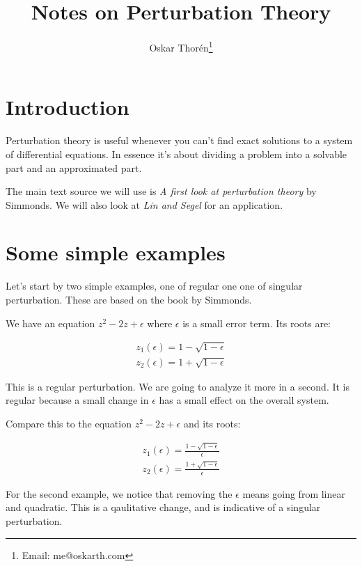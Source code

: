 \documentclass[12pt]{report}
\begin{document}
\title{Notes on Perturbation Theory}
\author{Oskar Thor{\'e}n\thanks{Email: me@oskarth.com}}

\maketitle

\chapter{Introduction}

Perturbation theory is useful whenever you can't find exact solutions
to a system of differential equations. In essence it's about dividing
a problem into a solvable part and an approximated part.

The main text source we will use is \textit{A first look at
  perturbation theory} by Simmonds. We will also look at \textit{Lin
  and Segel} for an application.

\chapter{Some simple examples}

Let's start by two simple examples, one of regular one one of singular
perturbation. These are based on the book by Simmonds.

We have an equation $z^2 - 2z + \epsilon$ where $\epsilon$ is a small
error term. Its roots are:

\begin{gather}
  z_1(\epsilon)=1 - \sqrt{1-\epsilon} \\
  z_2(\epsilon)=1 + \sqrt{1-\epsilon}
\end{gather}

This is a regular perturbation. We are going to analyze it more in a
second. It is regular because a small change in $\epsilon$ has a small
effect on the overall system.

Compare this to the equation $z^2 - 2z + \epsilon$ and its roots:

\begin{gather}
  z_1(\epsilon)=\frac{1 - \sqrt{1-\epsilon}}{\epsilon} \\
  z_2(\epsilon)=\frac{1 + \sqrt{1-\epsilon}}{\epsilon}
\end{gather}

For the second example, we notice that removing the $\epsilon$ means
going from linear and quadratic. This is a qaulitative change, and is
indicative of a singular perturbation.
\end{document}
